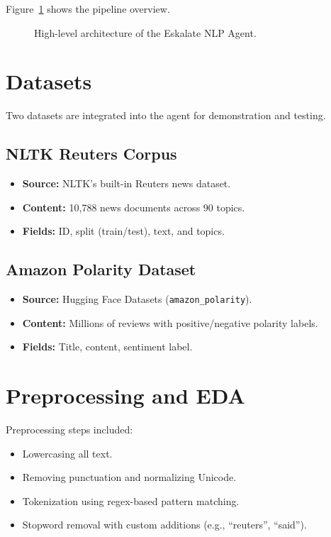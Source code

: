 \documentclass[12pt,a4paper]{article}
\begin{document}
\noindent Figure~\ref{fig:pipeline} shows the pipeline overview.

\begin{figure}[h]
\centering
{}
\caption{High-level architecture of the Eskalate NLP Agent.}
\label{fig:pipeline}
\end{figure}

\section{Datasets}
Two datasets are integrated into the agent for demonstration and testing.

\subsection{NLTK Reuters Corpus}
\begin{itemize}[noitemsep]
  \item \textbf{Source:} NLTK's built-in Reuters news dataset.
  \item \textbf{Content:} 10,788 news documents across 90 topics.
  \item \textbf{Fields:} ID, split (train/test), text, and topics.
\end{itemize}

\subsection{Amazon Polarity Dataset}
\begin{itemize}[noitemsep]
  \item \textbf{Source:} Hugging Face Datasets (\texttt{amazon\_polarity}).
  \item \textbf{Content:} Millions of reviews with positive/negative polarity labels.
  \item \textbf{Fields:} Title, content, sentiment label.
\end{itemize}

\section{Preprocessing and EDA}
Preprocessing steps included:
\begin{itemize}[noitemsep]
  \item Lowercasing all text.
  \item Removing punctuation and normalizing Unicode.
  \item Tokenization using regex-based pattern matching.
  \item Stopword removal with custom additions (e.g., ``reuters'', ``said'').
\end{itemize}
\end{document}
